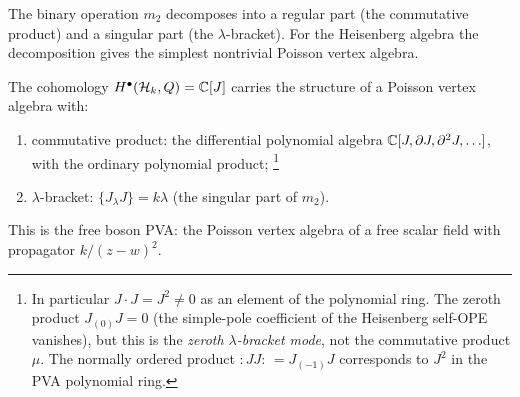 The binary operation $m_2$ decomposes into a regular part (the commutative product) and a singular part (the $\lambda$-bracket). For the Heisenberg algebra the decomposition gives the simplest nontrivial Poisson vertex algebra.

\begin{proposition}
\label{prop:rosetta-pva}
The cohomology $H^{\bullet}(\mathcal{H}_k, Q) = \mathbb{C}[J]$ carries the
structure of a Poisson vertex algebra with:
\begin{enumerate}[label=\textup{(\roman*)}]
\item\label{item:rosetta-pva-product}
 commutative product: the differential polynomial algebra
 $\mathbb{C}[J, \partial J, \partial^2 J, \ldots]$, with the
 ordinary polynomial product\textup{;}%
 \footnote{In particular $J \cdot J = J^2 \neq 0$ as an
 element of the polynomial ring. The zeroth product
 $J_{(0)}J = 0$ (the simple-pole coefficient of the
 Heisenberg self-OPE vanishes), but this is the
 \emph{zeroth $\lambda$-bracket mode}, not the
 commutative product $\mu$. The normally ordered product
 $:\!JJ\!:\, = J_{(-1)}J$ corresponds to $J^2$ in the
 PVA polynomial ring.}
\item\label{item:rosetta-pva-bracket}
 $\lambda$-bracket: $\{J_\lambda J\} = k\lambda$
 \textup{(}the singular part of $m_2$\textup{)}.
\end{enumerate}
This is the free boson PVA: the Poisson vertex algebra of a free
scalar field with propagator $k/(z - w)^2$.
\end{proposition}

